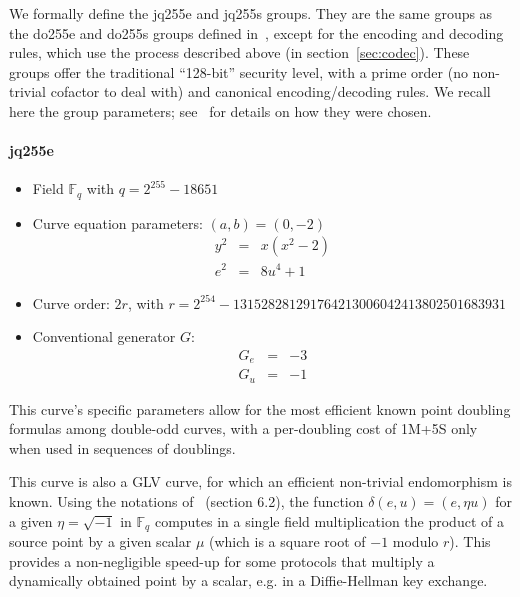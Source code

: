 \documentclass{llncs}
\newcommand{\bF}{\mathbb{F}}
\begin{document}
We formally define the jq255e and jq255s groups. They are the same
groups as the do255e and do255s groups defined in~\cite{Por2020-5},
except for the encoding and decoding rules, which use the process
described above (in section~\ref{sec:codec}). These groups offer the
traditional ``128-bit'' security level, with a prime order (no
non-trivial cofactor to deal with) and canonical encoding/decoding
rules. We recall here the group parameters; see~\cite{Por2020-5}
for details on how they were chosen.

\paragraph{jq255e}
\begin{itemize}

    \item Field $\bF_q$ with $q = 2^{255} - 18651$

    \item Curve equation parameters: $(a, b) = (0, -2)$
    \begin{eqnarray*}
        y^2 &=& x(x^2 - 2) \\
        e^2 &=& 8u^4 + 1
    \end{eqnarray*}

    \item Curve order: $2r$, with $r = 2^{254} - 131528281291764213006042413802501683931$

    \item Conventional generator $G$:
    \begin{eqnarray*}
        G_e &=& -3 \\
        G_u &=& -1
    \end{eqnarray*}

\end{itemize}

This curve's specific parameters allow for the most efficient known
point doubling formulas among double-odd curves, with a per-doubling
cost of 1M+5S only when used in sequences of doublings.

This curve is also a GLV curve\cite{GalLamVan2001}, for which an
efficient non-trivial endomorphism is known. Using the notations
of~\cite{Por2020-5} (section 6.2), the function $\delta(e,u) = (e, \eta
u)$ for a given $\eta = \sqrt{-1}$ in $\bF_q$ computes in a single field
multiplication the product of a source point by a given scalar $\mu$
(which is a square root of $-1$ modulo $r$). This provides a
non-negligible speed-up for some protocols that multiply a dynamically
obtained point by a scalar, e.g. in a Diffie-Hellman key exchange.
\end{document}
